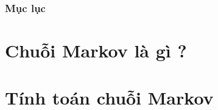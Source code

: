 




\maketitle

\begin{frame}
\frametitle{Mục lục}
\tableofcontents
\end{frame}


\section{Chuỗi Markov là gì ?}


\section{Tính toán chuỗi Markov}





